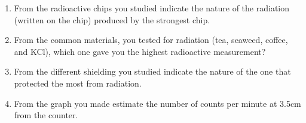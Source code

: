 \documentclass[main.tex]{subfiles}
\begin{document}
\begin{enumerate}
\item From the radioactive chips you studied indicate the nature of the radiation (written on the chip) produced by the strongest chip.
\vspace{2.5cm}

\item From the common materials, you tested for radiation (tea, seaweed, coffee, and KCl), which one gave you the highest radioactive measurement?
\vspace{2.5cm}

\item From the different shielding you studied indicate the nature of the one that protected the most from radiation.
\vspace{2.5cm}

\item From the graph you made estimate the number of counts per minute at 3.5cm from the counter.
\vspace{2.5cm}



\end{enumerate}

\clearpage\mbox{}\clearpage


 
\end{document}

